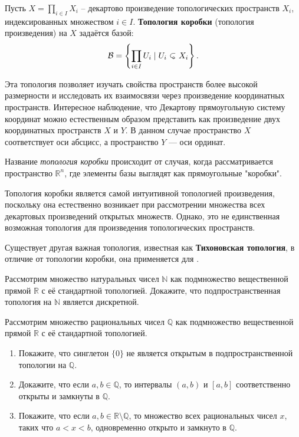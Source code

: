 \begin{definition}
	Пусть \(\displaystyle X = \prod_{i \in I} X_i\) -- декартово произведение топологических пространств \(X_i\), индексированных множеством \(i \in I\). \textbf{Топология коробки} (топология произведения) на \(X\) задаётся базой:
		\[
		\mathcal{B} = \left\{ \prod_{i \in I} U_i \mid U_i \open X_i \right\}.
		\]
\end{definition}
Эта топология позволяет изучать свойства пространств более высокой размерности и исследовать их взаимосвязи через произведение координатных пространств. Интересное наблюдение, что	Декартову прямоугольную систему координат можно естественным образом представить как произведение двух координатных пространств \(X\) и \(Y\). В данном случае пространство \(X\) соответствует оси абсцисс, а пространство \(Y\) — оси ординат.
\begin{remark}
	Название \textit{топология коробки} происходит от случая, когда рассматривается пространство \(\mathbb{R}^n\), где элементы базы выглядят как прямоугольные "коробки".
\end{remark}


\begin{remark}
	Топология коробки является самой интуитивной топологией произведения, поскольку она естественно возникает при рассмотрении множества всех декартовых произведений открытых множеств. Однако, это не единственная возможная топология для произведения топологических пространств. 

Существует другая важная топология, известная как \textbf{Тихоновская топология}, в отличие от топологии коробки, она применяется для .
\end{remark}

\begin{task}
	Рассмотрим множество натуральных чисел \(\mathbb{N}\) как подмножество вещественной прямой \(\mathbb{R}\) с её стандартной топологией. Докажите, что подпространственная топология на \(\mathbb{N}\) является дискретной. 
\end{task}

\begin{task}

	Рассмотрим множество рациональных чисел \(\mathbb{Q}\) как подмножество вещественной прямой \(\mathbb{R}\) с её стандартной топологией.
	\begin{enumerate}
		\item Покажите, что синглетон \(\{0\}\) не является открытым в подпространственной топологии на \(\mathbb{Q}\).
		\item Докажите, что если \(a, b \in \mathbb{Q}\), то интервалы \((a, b)\) и \([a, b]\) соответственно открыты и замкнуты в \(\mathbb{Q}\).
		\item Покажите, что если \(a, b \in \mathbb{R} \setminus \mathbb{Q}\), то множество всех рациональных чисел \(x\), таких что \(a < x < b\), одновременно открыто и замкнуто в \(\mathbb{Q}\).
	\end{enumerate}
\end{task}